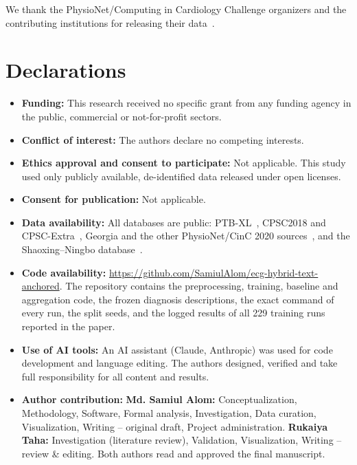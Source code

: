 \documentclass[pdflatex,sn-mathphys-num]{sn-jnl}
\theoremstyle{thmstyleone}%
\theoremstyle{thmstyletwo}%
\begin{document}

\maketitle








\backmatter

We thank the PhysioNet/Computing in Cardiology Challenge organizers and the contributing institutions for
releasing their data~\cite{goldberger2000,perez2020,reyna2022}.

\section*{Declarations}
\begin{itemize}
\item \textbf{Funding:} This research received no specific grant from any funding agency in the public, commercial or not-for-profit sectors.
\item \textbf{Conflict of interest:} The authors declare no competing interests.
\item \textbf{Ethics approval and consent to participate:} Not applicable. This study used only publicly
available, de-identified data released under open licenses.
\item \textbf{Consent for publication:} Not applicable.
\item \textbf{Data availability:} All databases are public: PTB-XL~\cite{wagner2020}, CPSC2018 and CPSC-Extra~\cite{liu_cpsc2018}, Georgia and the other
PhysioNet/CinC 2020 sources~\cite{perez2020}, and the Shaoxing--Ningbo database~\cite{zheng2020,zheng2022ningbo}.
\item \textbf{Code availability:} \url{https://github.com/SamiulAlom/ecg-hybrid-text-anchored}. The repository contains the preprocessing, training, baseline and aggregation code, the frozen diagnosis descriptions, the exact command of every run, the split seeds, and the logged results of all 229 training runs reported in the paper.
\item \textbf{Use of AI tools:} An AI assistant (Claude, Anthropic) was used for code development and language
editing. The authors designed, verified and take full responsibility for all content and results.
\item \textbf{Author contribution:} \textbf{Md. Samiul Alom:} Conceptualization, Methodology, Software, Formal analysis, Investigation, Data curation, Visualization, Writing -- original draft, Project administration. \textbf{Rukaiya Taha:} Investigation (literature review), Validation, Visualization, Writing -- review \& editing. Both authors read and approved the final manuscript.
\end{itemize}
\end{document}
